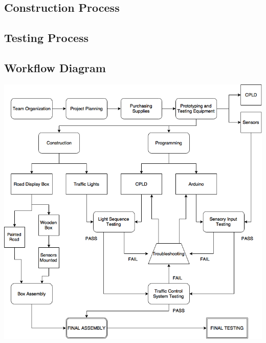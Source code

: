 \subsection{Construction Process}
\subsection{Testing Process}
\subsection{Workflow Diagram}
\includegraphics[scale=0.50]{DIGITALFLOW.png}
